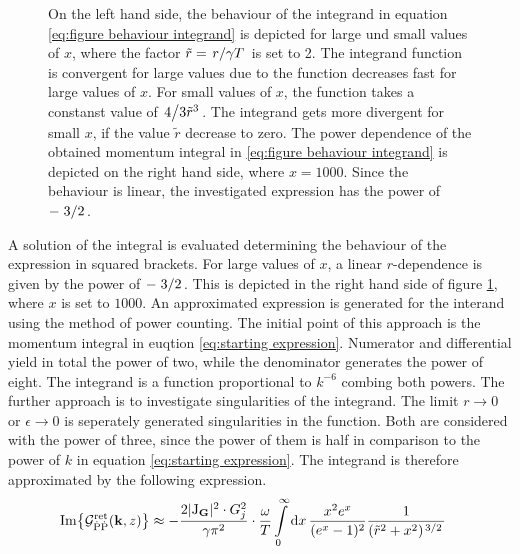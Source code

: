 \begin{figure}[t]
	\centering
	\caption{
On the left hand side, the behaviour of the integrand in equation \eqref{eq:figure behaviour integrand} is depicted for large und small values of $x$, where the factor $\tilde{r} = \flatfrac{r}{\gamma T}$ is set to 2.
The integrand function is convergent for large values due to the function decreases fast for large values of $x$.
For small values of $x$, the function takes a constanst value of $\flatfrac{4}{3\tilde{r}^{3}}$.
The integrand gets more divergent for small $x$, if the value $\tilde{r}$ decrease to zero.
The power dependence of the obtained momentum integral in \eqref{eq:figure behaviour integrand} is depicted on the right hand side, where $x=1000$.
Since the behaviour is linear, the investigated expression has the power of $-\flatfrac{3}{2}$.
	}
	\label{fig:behaviour integrand}
\end{figure}
%
A solution of the integral is evaluated determining the behaviour of the expression in squared brackets.
For large values of $x$, a linear $r$-dependence is given by the power of $-\flatfrac{3}{2}$.
This is depicted in the right hand side of figure \ref{fig:behaviour integrand}, where $x$ is set to $1000$.
An approximated expression is generated for the interand using the method of power counting.
The initial point of this approach is the momentum integral in euqtion \eqref{eq:starting expression}.
Numerator and differential yield in total the power of two, while the denominator generates the power of eight.
The integrand is a function proportional to $k^{-6}$ combing both powers.
The further approach is to investigate singularities of the integrand.
The limit $r \to 0$ or $\epsilon \to 0$ is seperately generated singularities in the function.
Both are considered with the power of three, since the power of them is half in comparison to the power of $k$ in equation \eqref{eq:starting expression}.
The integrand is therefore approximated by the following expression.
%
\begin{align}
	\Im{\mathcal{G}_{\dot{\mt{P}}\dot{\mt{P}}}^{\mt{ret}}(\vb{k}, z)} &\approx 
		-\frac{2 \vert \mt{J}_{\vb{G}} \vert^{2} \cdot G_{j}^{2}}{\gamma \pi^{2}} \cdot 
		\frac{\omega}{T}
		\int\limits_{0}^{\infty} \dd{x}
		\frac{x^{2} e^{x}}{(e^{x} - 1)^{2}}
		\frac{1}{(\tilde{r}^{2} + x^{2})^{\flatfrac{3}{2}}}
\end{align}
